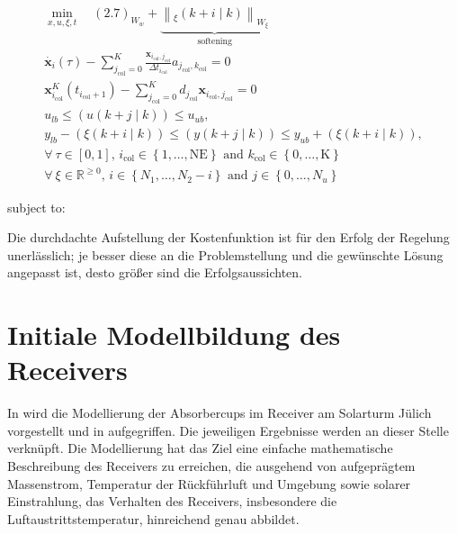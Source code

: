 \begin{equation} \label{eq_Optimierungsproblem}
\begin{gathered}
\min_{x, u, \xi, t} \quad (2.7)_{W_w}+\underbrace{\left\|_{\xi}(k+i \mid k)\right\|_{W_{\xi}}}_{\text {softening}} \qquad\\
\dot{\boldsymbol{x}_i}(\tau) - \sum_{j_{\mathrm{col}}=0}^K \frac{\boldsymbol{x}_{i_{\mathrm{col}}, j_{\mathrm{col}}}}{\Delta t_{i_{\mathrm{col}}}} a_{j_{\mathrm{col}},k_{\mathrm{col}}} = 0\\
\boldsymbol{x}_{i_{\mathrm{col}}}^K\left(t_{i_{\mathrm{col}}+1}\right) -\sum_{j_{\mathrm{col}}=0}^K d_{j_{\mathrm{col}}} \boldsymbol{x}_{i_{\mathrm{col}}, j_{\mathrm{col}}} = 0\\
u_{l b} \leq(u(k+j \mid k)) \leq u_{u b}, \\
y_{l b}-(\xi(k+i \mid k)) \leq(y(k+j \mid k)) \leq y_{u b}+(\xi(k+i \mid k)), \\
\forall~\tau \in \left[0,1\right] \text{, } i_{\mathrm{col}} \in \left\{1, \ldots, \mathrm{NE}\right\} \text{ and } k_{\mathrm{col}} \in \left\{0, \ldots, \mathrm{K}\right\}\\
\forall~\xi \in \mathbb{R}^{\geq0} \text{, }i \in\left\{N_1, \ldots, N_2-i\right\} \text { and } j \in\left\{0, \ldots, N_u\right\}
\end{gathered}
\end{equation}

\vspace*{-9.5\baselineskip}
\qquad subject to:
\vspace*{8.5\baselineskip}

Die durchdachte Aufstellung der Kostenfunktion ist für den Erfolg der Regelung unerlässlich; je besser diese an die Problemstellung und die gewünschte Lösung angepasst ist, desto größer sind die Erfolgsaussichten.

\section{Initiale Modellbildung des Receivers} \label{sec_Ausgangszustand}
In \cite[S.90ff]{DissGall} wird die Modellierung der Absorbercups im Receiver am Solarturm Jülich vorgestellt und in \cite{IdingSolarPaces} aufgegriffen.
Die jeweiligen Ergebnisse werden an dieser Stelle verknüpft.
Die Modellierung hat das Ziel eine einfache mathematische Beschreibung des Receivers zu erreichen, die ausgehend von aufgeprägtem Massenstrom, Temperatur der Rückführluft und Umgebung sowie solarer Einstrahlung, das Verhalten des Receivers, insbesondere die Luftaustrittstemperatur, hinreichend genau abbildet\cite[S.90]{DissGall}.

